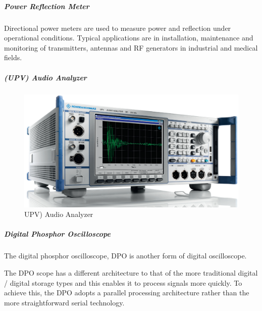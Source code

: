 	
\subparagraph{Power Reflection Meter}
	
	Directional power meters are used to
measure power and reflection under
operational conditions. Typical applications
are in installation, maintenance and
monitoring of transmitters, antennas and
RF generators in industrial and medical
fields. 

\subparagraph{(UPV) Audio Analyzer}

\begin{figure}[H]
	\center
	\setlength{\unitlength}{\textwidth} 
	\includegraphics[width=1.0\unitlength]{audany}
	\caption{\label{fig:audany}UPV) Audio Analyzer}
\end{figure}

\subparagraph{Digital Phosphor Oscilloscope}

	The digital phosphor oscilloscope, DPO is another form of digital oscilloscope.

	The DPO scope has a different architecture to that of the more traditional digital / digital storage types and this enables it to process signals more quickly. To achieve this, the DPO adopts a parallel processing architecture rather than the more straightforward serial technology.




